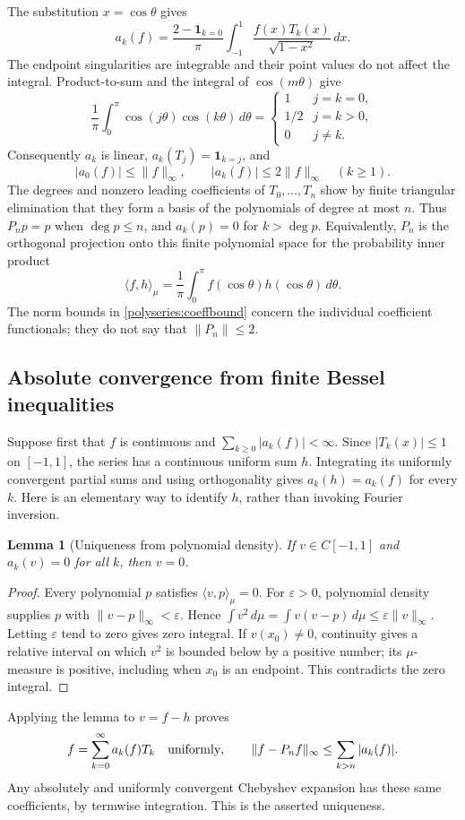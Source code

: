 \documentclass[11pt]{article}
\newtheorem{lemma}[theorem]{Lemma}
\theoremstyle{remark}
\numberwithin{equation}{section}
\begin{document}
The substitution $x=\cos\theta$ gives
\[
 a_k(f)=\frac{2-\mathbf1_{k=0}}\pi
 \int_{-1}^1\frac{f(x)T_k(x)}{\sqrt{1-x^2}}\,dx.
\]
The endpoint singularities are integrable and their point values do not
affect the integral. Product-to-sum and the integral of $\cos(m\theta)$ give
\[
 \frac1\pi\int_0^\pi\cos(j\theta)\cos(k\theta)\,d\theta
 =\begin{cases}1&j=k=0,\\1/2&j=k>0,\\0&j\ne k.\end{cases}
\]
Consequently $a_k$ is linear, $a_k(T_j)=\mathbf1_{k=j}$, and
\begin{equation}\label{polyseries:coeffbound}
 |a_0(f)|\le\|f\|_\infty,\qquad |a_k(f)|\le2\|f\|_\infty\quad(k\ge1).
\end{equation}
The degrees and nonzero leading coefficients of $T_0,\ldots,T_n$ show by
finite triangular elimination that they form a basis of the polynomials
of degree at most $n$. Thus $P_np=p$ when $\deg p\le n$, and $a_k(p)=0$
for $k>\deg p$. Equivalently, $P_n$ is the orthogonal projection onto this
finite polynomial space for the probability inner product
\[
 \langle f,h\rangle_\mu=\frac1\pi\int_0^\pi
       f(\cos\theta)h(\cos\theta)\,d\theta.
\]
The norm bounds in \eqref{polyseries:coeffbound} concern the individual
coefficient functionals; they do not say that $\|P_n\|\le2$.

\subsection{Absolute convergence from finite Bessel inequalities}
\label{polyseries:convergence}
Suppose first that $f$ is continuous and $\sum_{k\ge0}|a_k(f)|<\infty$.
Since $|T_k(x)|\le1$ on $[-1,1]$, the series has a continuous uniform sum
$h$. Integrating its uniformly convergent partial sums and using
orthogonality gives $a_k(h)=a_k(f)$ for every $k$. Here is an elementary
way to identify $h$, rather than invoking Fourier inversion.

\begin{lemma}[Uniqueness from polynomial density]\label{polyseries:uniqueness}
If $v\in C[-1,1]$ and $a_k(v)=0$ for all $k$, then $v=0$.
\end{lemma}
\begin{proof}
Every polynomial $p$ satisfies $\langle v,p\rangle_\mu=0$. For
$\varepsilon>0$, polynomial density supplies $p$ with
$\|v-p\|_\infty<\varepsilon$. Hence
$\int v^2\,d\mu=\int v(v-p)\,d\mu\le\varepsilon\|v\|_\infty$.
Letting $\varepsilon$ tend to zero gives zero integral. If $v(x_0)\ne0$,
continuity gives a relative interval on which $v^2$ is bounded below by a
positive number; its $\mu$-measure is positive, including when $x_0$ is
an endpoint. This contradicts the zero integral.
\end{proof}
Applying the lemma to $v=f-h$ proves
\begin{equation}\label{polyseries:tail}
 f=\sum_{k=0}^\infty a_k(f)T_k\quad\hbox{uniformly},\qquad
 \|f-P_nf\|_\infty\le\sum_{k>n}|a_k(f)|.
\end{equation}
Any absolutely and uniformly convergent Chebyshev expansion has these
same coefficients, by termwise integration. This is the asserted uniqueness.
\end{document}
